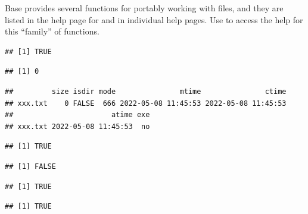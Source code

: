 \documentclass[krantz2]{krantz}\usepackage{knitr}
\begin{document}
Base \Rlang provides several functions for portably working with files, and they are listed in the help page for  and in individual help pages. Use  to access the help for this ``family'' of functions.

\begin{knitrout}\footnotesize
{}\color{fgcolor}\begin{kframe}
\begin{alltt}
 \hlstd{(}\hlopt{!}\hlstd{(}\hlstd{)) \{}
  \hlstd{(}\hlstd{)}
\hlstd{\}}
\end{alltt}
\begin{verbatim}
## [1] TRUE
\end{verbatim}
\begin{alltt}
\hlstd{(}\hlstd{)}
\end{alltt}
\begin{verbatim}
## [1] 0
\end{verbatim}
\begin{alltt}
\hlstd{(}\hlstd{)}
\end{alltt}
\begin{verbatim}
##         size isdir mode               mtime               ctime
## xxx.txt    0 FALSE  666 2022-05-08 11:45:53 2022-05-08 11:45:53
##                       atime exe
## xxx.txt 2022-05-08 11:45:53  no
\end{verbatim}
\begin{alltt}
\hlstd{(}\hlstd{,} \hlstd{)}
\end{alltt}
\begin{verbatim}
## [1] TRUE
\end{verbatim}
\begin{alltt}
\hlstd{(}\hlstd{)}
\end{alltt}
\begin{verbatim}
## [1] FALSE
\end{verbatim}
\begin{alltt}
\hlstd{(}\hlstd{)}
\end{alltt}
\begin{verbatim}
## [1] TRUE
\end{verbatim}
\begin{alltt}
\hlstd{(}\hlstd{)}
\end{alltt}
\begin{verbatim}
## [1] TRUE
\end{verbatim}
\end{kframe}
\end{knitrout}
\end{document}
